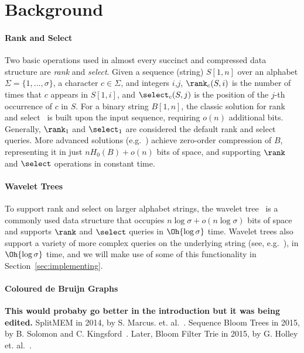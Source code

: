 
\section{Background}\label{sec:related}

\paragraph{Rank and Select}
\label{sec:rank}
Two basic operations
used in almost every succinct and compressed data structure are {\em rank} and
{\em select}. Given a sequence (string) $S[1,n]$ over an alphabet $\Sigma =
\{1,\ldots,\sigma\}$, a character $c \in \Sigma $, and integers
$i$,$j$, $\rank_c(S,i)$ is the number of times that $c$ appears in
$S[1,i]$, and $\select_c(S,j)$ is the position of the $j$-th
occurrence of $c$ in $S$.
For a binary string $B[1,n]$, the classic solution for rank and select~\cite{Mun96} 
is built upon the input sequence, requiring $o(n)$ additional bits.
Generally, $\rank_1$ and $\select_1$ are considered the default
rank and select queries.
More advanced solutions (e.g.~\cite{bitvector}) achieve zero-order 
compression of $B$,
representing it in just $nH_0(B) + o(n)$ bits of space, and supporting $\rank$ and
$\select$ operations in constant time. 

\paragraph{Wavelet Trees}
\label{sec:WVT}
To support rank and select on larger alphabet strings, the wavelet tree~\cite{ggv2003,n2013} is a 
commonly used data structure that occupies $n\log\sigma + o(n\log\sigma)$
bits of space and supports $\rank$ and $\select$ queries in $\Oh{\log\sigma}$ time.
Wavelet trees also support a variety of more complex queries on the underlying string (see, e.g.~\cite{gnp2012}),
in $\Oh{\log\sigma}$ time, and we will make use of some of this functionality in Section~\ref{sec:implementing}.

\paragraph{Coloured de Bruijn Graphs}
\textbf{This would probaby go better in the introduction but it was being edited.}
SplitMEM in 2014, by S. Marcus. et. al.~\cite{splitmem}. Sequence Bloom Trees in 2015, by B. Solomon and C. Kingsford~\cite{SBT}.
Later, Bloom Filter Trie in 2015, by G. Holley et. al.~\cite{BFT}.
